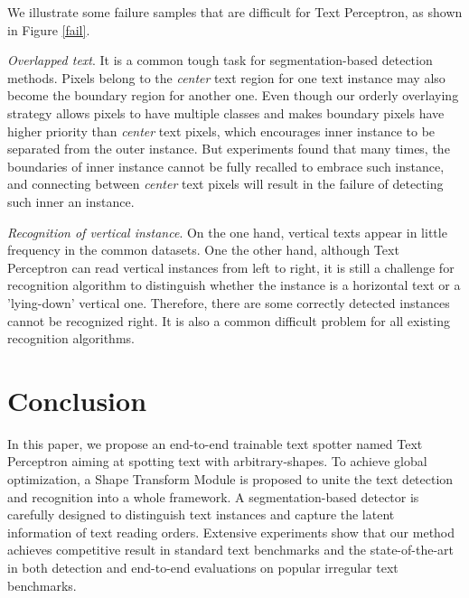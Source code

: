 \documentclass[letterpaper]{article} \usepackage{aaai20}  \usepackage{times}  \usepackage{helvet} \usepackage{courier}  \usepackage[hyphens]{url}  \usepackage{graphicx} \urlstyle{rm} \def\UrlFont{\rm}  \usepackage{graphicx}  \frenchspacing  \setlength{\pdfpagewidth}{8.5in}  \setlength{\pdfpageheight}{11in}  \usepackage{amsmath}
\begin{document}
We illustrate some failure samples that are difficult for Text Perceptron, as shown in Figure \ref{fail}.

\emph{Overlapped text}. It is a common tough task for segmentation-based detection methods. Pixels belong to the \emph{center} text region for one text instance may also become the boundary region for another one. Even though our orderly overlaying strategy allows pixels to have multiple classes and makes boundary pixels have higher priority than \emph{center} text pixels, which encourages inner instance to be separated from the outer instance. But experiments found that many times, the boundaries of inner instance cannot be fully recalled to embrace such instance, and connecting between \emph{center} text pixels will result in the failure of detecting such inner an instance.

\emph{Recognition of vertical instance}. On the one hand, vertical texts appear in little frequency in the common datasets. One the other hand, although Text Perceptron can read vertical instances from left to right, it is still a challenge for recognition algorithm to distinguish whether the instance is a horizontal text or a 'lying-down' vertical one. Therefore, there are some correctly detected instances cannot be recognized right. It is also a common difficult problem for all existing recognition algorithms.


\section{Conclusion}
In this paper, we propose an end-to-end trainable text spotter named {Text Perceptron} aiming at spotting text with arbitrary-shapes.
To achieve global optimization, a Shape Transform Module is proposed to unite the text detection and recognition into a whole framework. A segmentation-based detector is carefully designed to distinguish text instances and capture the latent information of text reading orders.
Extensive experiments show that our method achieves competitive result in standard text benchmarks and the state-of-the-art in both detection and end-to-end evaluations on popular irregular text benchmarks.

\newpage
\fontsize{8pt}{9pt} \selectfont


\end{document}
